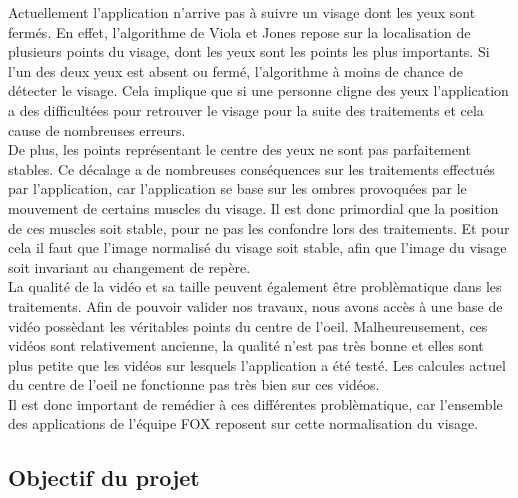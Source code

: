 Actuellement l'application n'arrive pas à suivre un visage dont les yeux sont fermés. En effet,
l'algorithme de Viola et Jones repose sur la localisation de plusieurs points du visage, dont 
les yeux sont les points les plus importants. Si l'un des deux yeux est absent ou fermé, l'algorithme 
à moins de chance de détecter le visage. Cela implique que si une personne cligne des yeux
l'application a des difficultées pour retrouver le visage pour la suite des traitements et cela 
cause de nombreuses erreurs.\\

De plus, les points représentant le centre des yeux ne sont pas parfaitement stables. Ce décalage a de 
nombreuses conséquences sur les traitements effectués par l'application, car l'application se base sur 
les ombres provoquées par le mouvement de certains muscles du 
visage. Il est donc primordial que la position de ces muscles soit stable, pour ne pas les confondre
lors des traitements. Et pour cela il faut que l'image normalisé du visage soit stable, afin que l'image
du visage soit invariant au changement de repère.\\

La qualité de la vidéo et sa taille peuvent également être problèmatique dans les traitements. Afin de
pouvoir valider nos travaux, nous avons accès à une base de vidéo possèdant les véritables points
du centre de l'oeil. Malheureusement, ces vidéos sont relativement ancienne, la qualité n'est pas 
très bonne et elles sont plus petite que les vidéos sur lesquels l'application a été testé. Les 
calcules actuel du centre de l'oeil ne fonctionne pas très bien sur ces vidéos.\\

Il est donc important de remédier à ces différentes problèmatique, car l'ensemble des applications
de l'équipe FOX reposent sur cette normalisation du visage.

\subsection{Objectif du projet}

